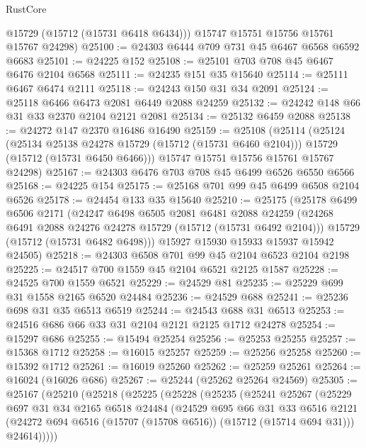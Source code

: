 \begin{lexlean}{RustCore}
\begin{coremodule}
        @15729
        (@15712 (@15731 @6418 @6434)))
      @15747
      @15751
      @15756
      @15761
      @15767
      @24298)
@25100 := @24303 @6444 @709 @731 @45 @6467 @6568 @6592 @6683
@25101 := @24225 @152
@25108 := @25101 @703 @708 @45 @6467 @6476 @2104 @6568
@25111 := @24235 @151 @35 @15640
@25114 := @25111 @6467 @6474 @2111
@25118 := @24243 @150 @31 @34 @2091
@25124 := @25118 @6466 @6473 @2081 @6449 @2088 @24259
@25132 := @24242 @148 @66 @31 @33 @2370 @2104 @2121 @2081
@25134 := @25132 @6459 @2088
@25138 := @24272 @147 @2370 @16486 @16490
@25159 := @25108
    (@25114
      (@25124
        (@25134 @25138 @24278 @15729 (@15712 (@15731 @6460 @2104)))
        @15729
        (@15712 (@15731 @6450 @6466)))
      @15747
      @15751
      @15756
      @15761
      @15767
      @24298)
@25167 := @24303 @6476 @703 @708 @45 @6499 @6526 @6550 @6566
@25168 := @24225 @154
@25175 := @25168 @701 @99 @45 @6499 @6508 @2104 @6526
@25178 := @24454 @133 @35 @15640
@25210 := @25175
    (@25178
      @6499
      @6506
      @2171
      (@24247
        @6498
        @6505
        @2081
        @6481
        @2088
        @24259
        (@24268 @6491 @2088 @24276 @24278 @15729 (@15712 (@15731 @6492 @2104)))
        @15729
        (@15712 (@15731 @6482 @6498)))
      @15927
      @15930
      @15933
      @15937
      @15942
      @24505)
@25218 := @24303 @6508 @701 @99 @45 @2104 @6523 @2104 @2198
@25225 := @24517 @700 @1559 @45 @2104 @6521 @2125 @1587
@25228 := @24525 @700 @1559 @6521
@25229 := @24529 @81
@25235 := @25229 @699 @31 @1558 @2165 @6520 @24484
@25236 := @24529 @688
@25241 := @25236 @698 @31 @35 @6513 @6519
@25244 := @24543 @688 @31 @6513
@25253 := @24516 @686 @66 @33 @31 @2104 @2121 @2125 @1712 @24278
@25254 := @15297 @686
@25255 := @15494 @25254
@25256 := @25253 @25255
@25257 := @15368 @1712
@25258 := @16015 @25257
@25259 := @25256 @25258
@25260 := @15392 @1712
@25261 := @16019 @25260
@25262 := @25259 @25261
@25264 := @16024 (@16026 @686)
@25267 := @25244 (@25262 @25264 @24569)
@25305 := @25167
    (@25210
      (@25218
        (@25225
          (@25228
            (@25235
              (@25241
                @25267
                (@25229
                  @697
                  @31
                  @34
                  @2165
                  @6518
                  @24484
                  (@24529
                    @695
                    @66
                    @31
                    @33
                    @6516
                    @2121
                    (@24272 @694 @6516 (@15707 (@15708 @6516)) (@15712 (@15714 @694 @31)))
                    @24614)))))

\end{coremodule}
\end{lexlean}
